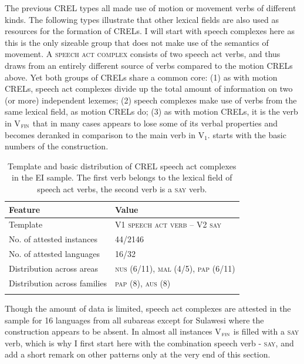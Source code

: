 The previous CREL types all made use of motion or movement verbs of different kinds. The following types  illustrate that other lexical fields are also used as resources for the formation of CRELs. I will start with speech complexes here as this is the only sizeable group that does not make use of the semantics of movement. A \textsc{speech act complex} consists of two speech act verbs, and thus draws from an entirely different source of verbs compared to the motion CRELs above. Yet both groups of CRELs share a common core: (1) as with motion CRELs, speech act complexes divide up the total amount of information on two (or more) independent lexemes; (2) speech complexes make use of verbs from the same lexical field, as motion CRELs do; (3) as with motion CRELs, it is the verb in V$_{\textsc{fin}}$ that in many cases appears to lose some of its verbal properties and becomes deranked in comparison to the main verb in V$_{1}$.  starts with the basic numbers of the construction.

\begin{table}
\begin{tabular}{ll}
\lsptoprule
Feature&Value\tabularnewline
\midrule
Template&V1 \textsc{speech act verb} -- V2 \textsc{\textsc{say}}\tabularnewline
No. of attested instances& 44/2146 \tabularnewline
No. of attested languages& 16/32 \tabularnewline
Distribution across areas& \textsc{nus} (6/11), \textsc{mal} (4/5), \textsc{pap} (6/11) \tabularnewline
Distribution across families& \textsc{pap} (8), \textsc{aus} (8) \tabularnewline
\lspbottomrule
\end{tabular}
\caption[Template and basic distribution of CREL speech act complexes]{Template and basic distribution of CREL speech act complexes in the EI sample. The first verb belongs to the lexical field of speech act verbs, the second verb is a \textsc{say} verb.}
\label{table:basiccrelspeech}
\end{table}

Though the amount of data is limited, speech act complexes are attested in the sample for 16 languages from all subareas except for Sulawesi where the construction appears to be absent. In almost all instances V$_{\textsc{fin}}$ is filled with a \textsc{say} verb, which is why I first start here with the combination speech verb - \textsc{say}, and add a short remark on other patterns only at the very end of this section. 

